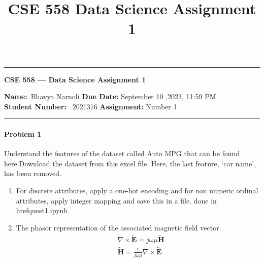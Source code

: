 \documentclass[12pt]{scrartcl}
\title{CSE 558 Data Science Assignment 1}
\begin{document}
\begin{center}
	\hrule
	\vspace{.4cm}
	{\textbf { \large CSE 558 --- Data Science Assignment 1}}
\end{center}
{\textbf{Name:}\ Bhavya Narnoli \hspace{\fill} \textbf{Due Date:} September 10 ,2023, 11:59 PM   \\
{ \textbf{Student Number:}} \ 2021316 \hspace{\fill} \textbf{Assignment:} Number 1 \\
	\hrule

\paragraph*{Problem 1} %
Understand the features of the dataset called Auto MPG that can be found here.Download the dataset from this excel file. Here, the last feature, ‘car name’, has been removed.
\begin{enumerate}[label=(\alph*)]
\item For discrete attributes, apply a one-hot encoding and for non numeric ordinal attributes, apply integer mapping and save this in a file. \newline
done in href{quest1.ipynb}
\item The phasor representation of the associated magnetic field vector. \newline 
\begin{align*}
& \nabla \times \tilde{\mathbf{E}} = j \omega \mu  \tilde{\mathbf{H}} \\
& \tilde{\mathbf{H}}=\frac{1}{j \omega \mu }  \nabla \times \tilde{\mathbf{E}}
\end{align*}


\end{enumerate}}
\end{document}
